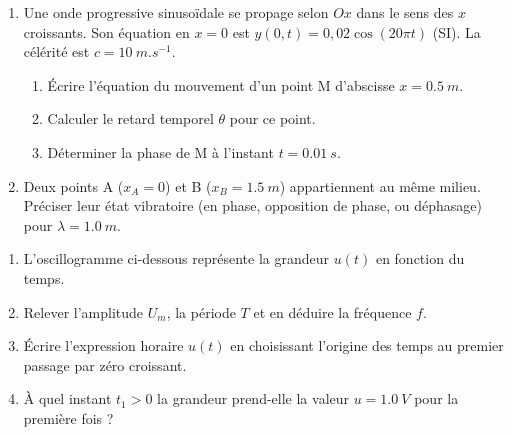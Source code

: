 \documentclass[11pt]{article}
\begin{document}
\begin{exercice}
\begin{enumerate}
    \item Une onde progressive sinusoïdale se propage selon $Ox$ dans le sens des $x$ croissants. Son équation en $x=0$ est $y(0,t) = 0,02 \cos(20\pi t)$ (SI). La célérité est $c = \SI{10}{m.s^{-1}}$.
    \begin{enumerate}
        \item Écrire l'équation du mouvement d'un point M d'abscisse $x = \SI{0,5}{m}$.
        \item Calculer le retard temporel $\theta$ pour ce point.
        \item Déterminer la phase de M à l'instant $t = \SI{0,01}{s}$.
    \end{enumerate}
    \item Deux points A ($x_A=0$) et B ($x_B=\SI{1,5}{m}$) appartiennent au même milieu. Préciser leur état vibratoire (en phase, opposition de phase, ou déphasage) pour $\lambda = \SI{1,0}{m}$.
\end{enumerate}
\end{exercice}

\begin{exercice}
\begin{enumerate}
    \item L'oscillogramme ci-dessous représente la grandeur $u(t)$ en fonction du temps.
    \begin{center}
    \end{center}
    \item Relever l'amplitude $U_m$, la période $T$ et en déduire la fréquence $f$.
    \item Écrire l'expression horaire $u(t)$ en choisissant l'origine des temps au premier passage par zéro croissant.
    \item À quel instant $t_1 > 0$ la grandeur prend-elle la valeur $u = \SI{1,0}{V}$ pour la première fois ?
\end{enumerate}
\end{exercice}
\end{document}
